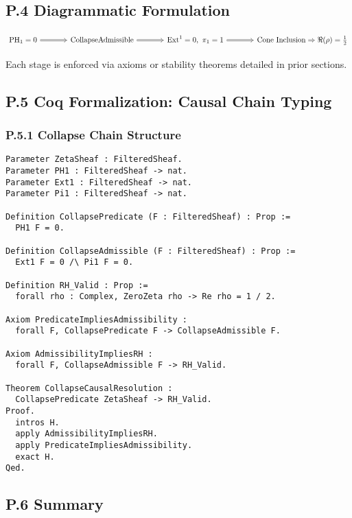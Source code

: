 \documentclass[11pt]{article}
\begin{document}
\subsection*{P.4 Diagrammatic Formulation}

\[
\begin{tikzcd}[row sep=large, column sep=large]
\mathrm{PH}_1 = 0
\arrow[r, Rightarrow] & \text{CollapseAdmissible}
\arrow[r, Rightarrow] & \mathrm{Ext}^1 = 0,\ \pi_1 = 1
\arrow[r, Rightarrow] & \text{Cone Inclusion} \Rightarrow \Re(\rho) = \tfrac{1}{2}
\end{tikzcd}
\]

Each stage is enforced via axioms or stability theorems detailed in prior sections.

\subsection*{P.5 Coq Formalization: Causal Chain Typing}

\subsubsection*{P.5.1 Collapse Chain Structure}

\begin{lstlisting}[language=Coq, caption=Collapse Causal Chain Typing, captionpos=b]
Parameter ZetaSheaf : FilteredSheaf.
Parameter PH1 : FilteredSheaf -> nat.
Parameter Ext1 : FilteredSheaf -> nat.
Parameter Pi1 : FilteredSheaf -> nat.

Definition CollapsePredicate (F : FilteredSheaf) : Prop :=
  PH1 F = 0.

Definition CollapseAdmissible (F : FilteredSheaf) : Prop :=
  Ext1 F = 0 /\ Pi1 F = 0.

Definition RH_Valid : Prop :=
  forall rho : Complex, ZeroZeta rho -> Re rho = 1 / 2.

Axiom PredicateImpliesAdmissibility :
  forall F, CollapsePredicate F -> CollapseAdmissible F.

Axiom AdmissibilityImpliesRH :
  forall F, CollapseAdmissible F -> RH_Valid.

Theorem CollapseCausalResolution :
  CollapsePredicate ZetaSheaf -> RH_Valid.
Proof.
  intros H.
  apply AdmissibilityImpliesRH.
  apply PredicateImpliesAdmissibility.
  exact H.
Qed.
\end{lstlisting}

\subsection*{P.6 Summary}
\end{document}
